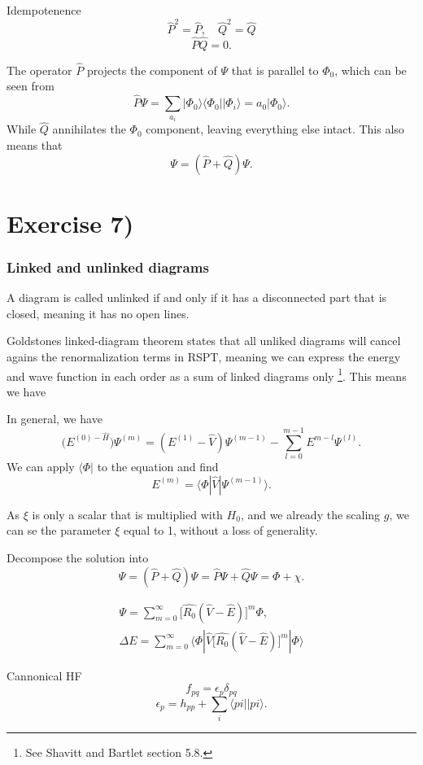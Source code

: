\documentclass[a4paper, 11pt, notitlepage, english]{article}
\newcommand{\bra}[1]{\langle #1|}
\newcommand{\ket}[1]{|#1 \rangle}
\newcommand{\brakket}[2]{\langle #1 || #2 \rangle}
\newcommand{\op}[1]{\hat{#1}}
\newcommand{\braopket}[3]{\langle #1 | {#2} | #3 \rangle}
\newcommand{\ketbra}[2]{\ket{#1}\bra{#2}}
\newcommand{\eps}{\epsilon}
\begin{document}
Idempotenence
$$\op{P}^2 = \op{P}, \quad \op{Q}^2 = \op{Q}$$
$$\op{P}\op{Q} = 0. $$

The operator $\op{P}$ projects the component of $\Psi$ that is parallel to $\Phi_0$, which can be seen from
$$\op{P}\Psi = \sum_{a_i}\ketbra{\Phi_0}{\Phi_0}\ket{\Phi_i} = a_0\ket{\Phi_0}.$$
While $\op{Q}$ annihilates the $\Phi_0$ component, leaving everything else intact. This also means that
$$\Psi = (\op{P} + \op{Q})\Psi.$$

\clearpage

\section*{Exercise 7)}

\subsubsection*{Linked and unlinked diagrams}

A diagram is called unlinked if and only if it has a disconnected part that is closed, meaning it has no open lines.


Goldstones linked-diagram theorem states that all unliked diagrams will cancel agains the renormalization terms in RSPT, meaning we can express the energy and wave function in each order as a sum of linked diagrams only \footnote{See Shavitt and Bartlet section 5.8.}. This means we have

\clearpage

In general, we have
$$\big(E^{(0) - \op{H}}\big) \Psi^{(m)} = (E^{(1)}-\op{V})\Psi^{(m-1)} - \sum_{l=0}^{m-1} E^{m-l}\Psi^{(l)}.$$
We can apply $\bra{\Phi}$ to the equation and find
$$E^{(m)} = \braopket{\Phi}{\op{V}}{\Psi^{(m-1)}}.$$

As $\xi$ is only a scalar that is multiplied with $H_0$, and we already the scaling $g$, we can se the parameter $\xi$ equal to 1, without a loss of generality.

Decompose the solution into
$$\Psi = (\op{P} + \op{Q})\Psi = \op{P}\Psi + \op{Q}\Psi = \Phi + \chi.$$

\begin{align*}
\Psi = \sum_{m=0}^\infty \big[\op{R_0}(\op{V}-\op{E}) \big]^m \Phi, \\
\Delta E = \sum_{m=0}^\infty \braopket{\Phi}{\op{V}\big[\op{R_0}(\op{V}-\op{E}) \big]^m}{\Phi}
\end{align*}


Cannonical HF
$$f_{pq} = \eps_p \delta_{pq}$$
$$\eps_p = h_{pp} + \sum_{i} \brakket{pi}{pi}.$$
\end{document}
